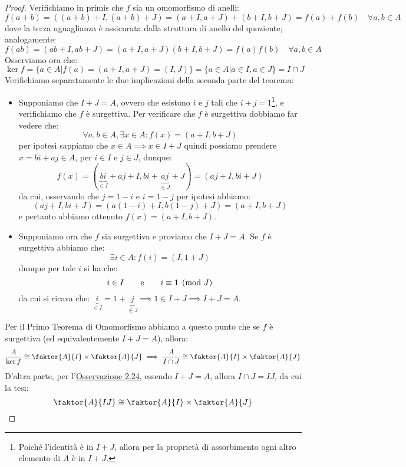 \documentclass[11pt]{scrartcl}
\begin{document}
\begin{proof}
    Verifichiamo in primis che $f$ sia un omomorfismo di anelli:
        \[ f(a+b) = ((a+b)+I,(a+b)+J) = (a+I,a+J) + (b+I,b+J) = f(a)+f(b) \quad \forall a,b \in A
            \]
    dove la terza uguaglianza è assicurata dalla struttura di anello del quoziente; analogamente:
        \[ f(ab) = (ab+I,ab+J) = (a+I,a+J)(b+I,b+J) = f(a)f(b) \quad \forall a,b \in A
            \]
    Osserviamo ora che:
        \[ \ker f =\{a \in A | f(a) = (a+I,a+J) = (I,J)\} = \{a\in A | a \in I, a \in J\} = I \cap J
            \]
    Verifichiamo separatamente le due implicazioni della seconda parte del teorema:
    \begin{itemize}
        \item Supponiamo che $I+J = A$, ovvero che esistono $i$ e $j$ tali che $i+j = 1$\footnote{Poiché
        l'identità è in $I+J$, allora per la proprietà di assorbimento ogni altro elemento di $A$ è in $I+J$.},
        e verifichiamo che $f$ è surgettiva. Per verificare che $f$ è surgettiva dobbiamo far vedere che:
            \[ \forall a,b \in A, \exists x \in A : f(x) = (a+I,b+J)
                \]
        per ipotesi sappiamo che $x \in A \implies x \in I+J$ quindi possiamo prendere $x = bi + aj \in A$, per $i \in I$ e $j \in J$, dunque:
            \[ f(x) = (\underbrace{bi}_{\in I} + aj + I, bi + \underbrace{aj}_{\in J} + J) = (aj + I, bi +J)
                \]
        da cui, osservando che $j = 1-i$ e $i = 1 - j$ per ipotesi abbiamo:
            \[ (aj+I,bi+J) = (a(1-i)+I,b(1-j)+J) = (a+I,b+J)
                \]
        e pertanto abbiamo ottenuto $f(x) = (a+I,b+J)$.
        \item Supponiamo ora che $f$ sia surgettiva e proviamo che $I+J = A$. Se $f$ è surgettiva abbiamo che:
            \[ \exists i \in A : f(i) = (I,1+J)
                \]
        dunque per tale $i$ si ha che:
            \[ i \in I \qquad \text e \qquad i \equiv 1 \pmod J
                \]
        da cui si ricava che: $\underbrace{i}_{\in I} = 1 + \underbrace{j}_{\in J} \implies 1 \in I+J \implies I+J = A$.
    \end{itemize}
    Per il Primo Teorema di Omomorfismo abbiamo a questo punto che se $f$ è surgettiva (ed equivalentemente $I+J = A$), allora:
            \[ \frac{A}{\ker f} \cong \faktor{A}{I} \times \faktor{A}{J} \implies \frac{A}{I \cap J} \cong \faktor{A}{I} \times \faktor{A}{J}
                \]
    D'altra parte, per l'\hyperref[2.24]{Osservazione 2.24}, essendo $I+J = A$, allora $I \cap J = IJ$, da cui la tesi:
        \[\faktor{A}{IJ} \cong \faktor{A}{I} \times \faktor{A}{J}
            \]
\end{proof}
\end{document}
